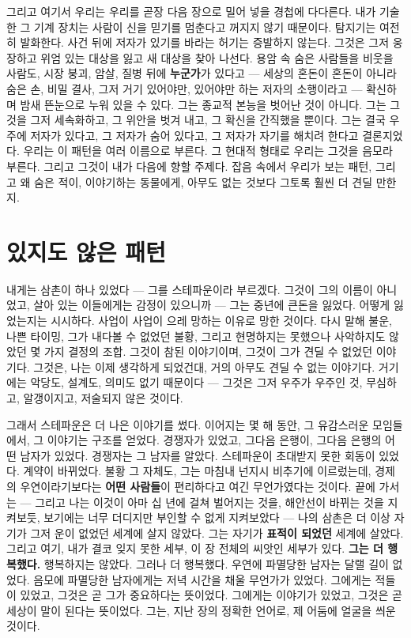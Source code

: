 그리고 여기서 우리는 우리를 곧장 다음 장으로 밀어 넣을 경첩에 다다른다. 내가 기술한 그 기계 장치는 사람이 신을 믿기를 멈춘다고 꺼지지 않기 때문이다. 탐지기는 여전히 발화한다. 사건 뒤에 저자가 있기를 바라는 허기는 증발하지 않는다. 그것은 그저 웅장하고 위엄 있는 대상을 잃고 새 대상을 찾아 나선다. 용암 속 숨은 사람들을 비웃을 사람도, 시장 붕괴, 암살, 질병 뒤에 \textbf{누군가}가 있다고 — 세상의 혼돈이 혼돈이 아니라 숨은 손, 비밀 결사, 그저 거기 있어야만, 있어야만 하는 저자의 소행이라고 — 확신하며 밤새 뜬눈으로 누워 있을 수 있다. 그는 종교적 본능을 벗어난 것이 아니다. 그는 그것을 그저 세속화하고, 그 위안을 벗겨 내고, 그 확신을 간직했을 뿐이다. 그는 결국 우주에 저자가 있다고, 그 저자가 숨어 있다고, 그 저자가 자기를 해치려 한다고 결론지었다. 우리는 이 패턴을 여러 이름으로 부른다. 그 현대적 형태로 우리는 그것을 음모라 부른다. 그리고 그것이 내가 다음에 향할 주제다. 잡음 속에서 우리가 보는 패턴, 그리고 왜 숨은 적이, 이야기하는 동물에게, 아무도 없는 것보다 그토록 훨씬 더 견딜 만한지.

\chapter{있지도 않은 패턴}

내게는 삼촌이 하나 있었다 — 그를 스테파운이라 부르겠다. 그것이 그의 이름이 아니었고, 살아 있는 이들에게는 감정이 있으니까 — 그는 중년에 큰돈을 잃었다. 어떻게 잃었는지는 시시하다. 사업이 사업이 으레 망하는 이유로 망한 것이다. 다시 말해 불운, 나쁜 타이밍, 그가 내다볼 수 없었던 불황, 그리고 현명하지는 못했으나 사악하지도 않았던 몇 가지 결정의 조합. 그것이 참된 이야기이며, 그것이 그가 견딜 수 없었던 이야기다. 그것은, 나는 이제 생각하게 되었건대, 거의 아무도 견딜 수 없는 이야기다. 거기에는 악당도, 설계도, 의미도 없기 때문이다 — 그것은 그저 우주가 우주인 것, 무심하고, 알갱이지고, 저술되지 않은 것이다.

그래서 스테파운은 더 나은 이야기를 썼다. 이어지는 몇 해 동안, 그 유감스러운 모임들에서, 그 이야기는 구조를 얻었다. 경쟁자가 있었고, 그다음 은행이, 그다음 은행의 어떤 남자가 있었다. 경쟁자는 그 남자를 알았다. 스테파운이 초대받지 못한 회동이 있었다. 계약이 바뀌었다. 불황 그 자체도, 그는 마침내 넌지시 비추기에 이르렀는데, 경제의 우연이라기보다는 \textbf{어떤 사람들}이 편리하다고 여긴 무언가였다는 것이다. 끝에 가서는 — 그리고 나는 이것이 아마 십 년에 걸쳐 벌어지는 것을, 해안선이 바뀌는 것을 지켜보듯, 보기에는 너무 더디지만 부인할 수 없게 지켜보았다 — 나의 삼촌은 더 이상 자기가 그저 운이 없었던 세계에 살지 않았다. 그는 자기가 \textbf{표적이 되었던} 세계에 살았다. 그리고 여기, 내가 결코 잊지 못한 세부, 이 장 전체의 씨앗인 세부가 있다. \textbf{그는 더 행복했다.} 행복하지는 않았다. 그러나 더 행복했다. 우연에 파멸당한 남자는 달랠 길이 없었다. 음모에 파멸당한 남자에게는 저녁 시간을 채울 무언가가 있었다. 그에게는 적들이 있었고, 그것은 곧 그가 중요하다는 뜻이었다. 그에게는 이야기가 있었고, 그것은 곧 세상이 말이 된다는 뜻이었다. 그는, 지난 장의 정확한 언어로, 제 어둠에 얼굴을 씌운 것이다.

